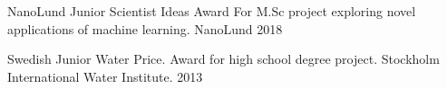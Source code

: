 


\begin{cvhonors}


\cvhonor
{NanoLund Junior Scientist Ideas Award} %
{For M.Sc project exploring novel applications of machine learning.} %
{NanoLund} %
{2018} %


\cvhonor
{Swedish Junior Water Price.} %
{Award for high school degree project.} %
{Stockholm International Water Institute.} %
{2013} %


\end{cvhonors}

